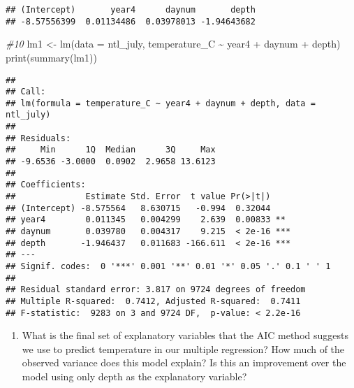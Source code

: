 \documentclass[
]{article}
\newenvironment{Shaded}{\begin{snugshade}}{\end{snugshade}}
\newcommand{\AttributeTok}[1]{\textcolor[rgb]{0.77,0.63,0.00}{#1}}
\newcommand{\CommentTok}[1]{\textcolor[rgb]{0.56,0.35,0.01}{\textit{#1}}}
\newcommand{\FunctionTok}[1]{\textcolor[rgb]{0.00,0.00,0.00}{#1}}
\newcommand{\NormalTok}[1]{#1}
\newcommand{\OtherTok}[1]{\textcolor[rgb]{0.56,0.35,0.01}{#1}}
\newcommand{\SpecialCharTok}[1]{\textcolor[rgb]{0.00,0.00,0.00}{#1}}
\providecommand{\tightlist}{%
  \setlength{\itemsep}{0pt}\setlength{\parskip}{0pt}}
\begin{document}
\begin{Shaded}
\end{Shaded}

\begin{verbatim}
## (Intercept)       year4      daynum       depth 
## -8.57556399  0.01134486  0.03978013 -1.94643682
\end{verbatim}

\begin{Shaded}
\begin{Highlighting}[]
\CommentTok{\#10}
\NormalTok{lm1 }\OtherTok{\textless{}{-}} \FunctionTok{lm}\NormalTok{(}\AttributeTok{data =}\NormalTok{ ntl\_july, temperature\_C }\SpecialCharTok{\textasciitilde{}}\NormalTok{ year4 }\SpecialCharTok{+}\NormalTok{ daynum }\SpecialCharTok{+}\NormalTok{ depth)}
\FunctionTok{print}\NormalTok{(}\FunctionTok{summary}\NormalTok{(lm1))}
\end{Highlighting}
\end{Shaded}

\begin{verbatim}
## 
## Call:
## lm(formula = temperature_C ~ year4 + daynum + depth, data = ntl_july)
## 
## Residuals:
##     Min      1Q  Median      3Q     Max 
## -9.6536 -3.0000  0.0902  2.9658 13.6123 
## 
## Coefficients:
##              Estimate Std. Error  t value Pr(>|t|)    
## (Intercept) -8.575564   8.630715   -0.994  0.32044    
## year4        0.011345   0.004299    2.639  0.00833 ** 
## daynum       0.039780   0.004317    9.215  < 2e-16 ***
## depth       -1.946437   0.011683 -166.611  < 2e-16 ***
## ---
## Signif. codes:  0 '***' 0.001 '**' 0.01 '*' 0.05 '.' 0.1 ' ' 1
## 
## Residual standard error: 3.817 on 9724 degrees of freedom
## Multiple R-squared:  0.7412, Adjusted R-squared:  0.7411 
## F-statistic:  9283 on 3 and 9724 DF,  p-value: < 2.2e-16
\end{verbatim}

\begin{enumerate}
\def\labelenumi{\arabic{enumi}.}
\setcounter{enumi}{10}
\tightlist
\item
  What is the final set of explanatory variables that the AIC method
  suggests we use to predict temperature in our multiple regression? How
  much of the observed variance does this model explain? Is this an
  improvement over the model using only depth as the explanatory
  variable?
\end{enumerate}
\end{document}
